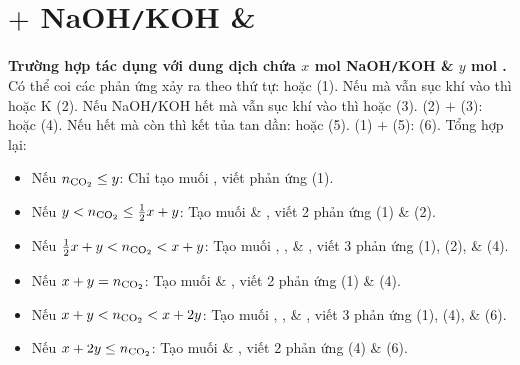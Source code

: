 \documentclass{article}
\begin{document}
\section{ $+$ NaOH{\tt/}KOH \& }
\textbf{\textsf{Trường hợp  tác dụng với dung dịch chứa $x$ mol NaOH{\tt/}KOH \& $y$ mol .}} Có thể coi các phản ứng xảy ra theo thứ tự:  hoặc  (1). Nếu  mà vẫn sục khí  vào thì  hoặc K (2). Nếu NaOH{\tt/}KOH hết mà vẫn sục khí  vào thì  hoặc  (3). (2) $+$ (3):  hoặc  (4). Nếu  hết mà  còn thì kết tủa tan dần:  hoặc  (5). (1) $+$ (5):  (6). Tổng hợp lại:
\begin{itemize}
	\item Nếu $n_{\ce{CO2}}\le y$: Chỉ tạo muối , viết phản ứng (1).
	\item Nếu $y < n_{\ce{CO2}}\le\frac{1}{2}x + y$: Tạo muối  \& , viết 2 phản ứng (1) \& (2).
	\item Nếu $\frac{1}{2}x + y < n_{\ce{CO2}} < x + y$: Tạo muối , , \& , viết 3 phản ứng (1), (2), \& (4).
	\item Nếu $x + y = n_{\ce{CO2}}$: Tạo muối  \& , viết 2 phản ứng (1) \& (4).
	\item Nếu $x + y < n_{\ce{CO2}} < x + 2y$: Tạo muối , , \& , viết 3 phản ứng (1), (4), \& (6).
	\item Nếu $x + 2y\le n_{\ce{CO2}}$: Tạo muối  \& , viết 2 phản ứng (4) \& (6).
\end{itemize}
\end{document}
